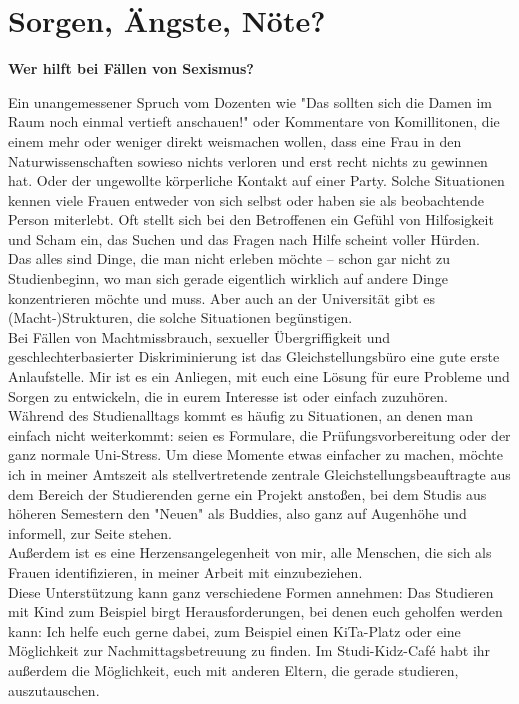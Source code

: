 \section{Sorgen, Ängste, Nöte?}
\textbf{Wer hilft bei Fällen von Sexismus?}

\begin{multicols}{2}
Ein unangemessener Spruch vom Dozenten wie "Das sollten sich die Damen im Raum noch einmal vertieft anschauen!" oder Kommentare von Komillitonen, die einem mehr oder weniger direkt weismachen wollen, dass eine Frau in den Naturwissenschaften sowieso nichts verloren und erst recht nichts zu gewinnen hat. Oder der ungewollte körperliche Kontakt auf einer Party. Solche Situationen kennen viele Frauen entweder von sich selbst oder haben sie als beobachtende Person miterlebt. Oft stellt sich bei den Betroffenen ein Gefühl von Hilfosigkeit und Scham ein, das Suchen und das Fragen nach Hilfe scheint voller Hürden. \\
Das alles sind Dinge, die man nicht erleben möchte – schon gar nicht zu Studienbeginn, wo man sich gerade eigentlich wirklich auf andere Dinge konzentrieren möchte und muss. Aber auch an der Universität gibt es (Macht-)Strukturen, die solche Situationen begünstigen. \\
Bei Fällen von Machtmissbrauch, sexueller Übergriffigkeit und geschlechterbasierter Diskriminierung ist das Gleichstellungsbüro eine gute erste Anlaufstelle. Mir ist es ein Anliegen, mit euch eine Lösung für eure Probleme und Sorgen zu entwickeln, die in eurem Interesse ist oder einfach zuzuhören. \\

Während des Studienalltags kommt es häufig zu Situationen, an denen man einfach nicht weiterkommt: seien es Formulare, die Prüfungsvorbereitung oder der ganz normale Uni-Stress. Um diese Momente etwas einfacher zu machen, möchte ich in meiner Amtszeit als stellvertretende zentrale Gleichstellungsbeauftragte aus dem Bereich der Studierenden gerne ein Projekt anstoßen, bei dem Studis aus höheren Semestern den "Neuen" als Buddies, also ganz auf Augenhöhe und informell, zur Seite stehen. \\
Außerdem ist es eine Herzensangelegenheit von mir, alle Menschen, die sich als Frauen identifizieren, in meiner Arbeit mit einzubeziehen. \\
Diese Unterstützung kann ganz verschiedene Formen annehmen: Das Studieren mit Kind zum Beispiel birgt Herausforderungen, bei denen euch geholfen werden kann: Ich helfe euch gerne dabei, zum Beispiel einen KiTa-Platz oder eine Möglichkeit zur Nachmittagsbetreuung zu finden. Im Studi-Kidz-Café habt ihr außerdem die Möglichkeit, euch mit anderen Eltern, die gerade studieren, auszutauschen. \\


\end{multicols}
